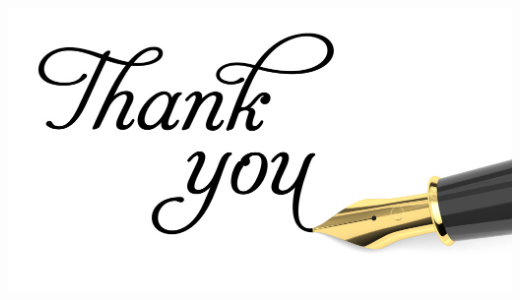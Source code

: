 \documentclass[a4paper, 12pt]{article}
\begin{document}
\newpage
\begin{center}
	
	
	\includegraphics{images/ThankYou}
	

\end{center}
	
\end{document}
